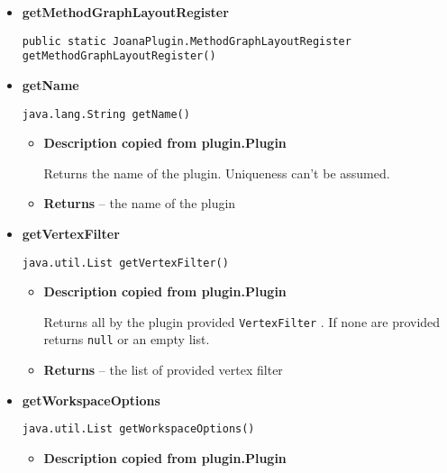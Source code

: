{{{{{{{{{{{{{{{{\begin{itemize}
{\begin{itemize}
{Returns all by the plugin provided \texttt{\small Importer}{\small 
{}}. If none are provided returns \texttt{\small null} or an empty list.
}
\item{{\bf  Returns} -- 
a list of provided importer 
}%
\end{itemize}
}%
\item{ 
{\bf  getMethodGraphLayoutRegister}\\
\begin{lstlisting}[frame=none]
public static JoanaPlugin.MethodGraphLayoutRegister getMethodGraphLayoutRegister()\end{lstlisting} %
}%
\item{ 
{\bf  getName}\\
\begin{lstlisting}[frame=none]
java.lang.String getName()\end{lstlisting} %
\begin{itemize}
\item{
{\bf  Description copied from plugin.Plugin{\small {}} }

Returns the name of the plugin. Uniqueness can't be assumed.
}
\item{{\bf  Returns} -- 
the name of the plugin 
}%
\end{itemize}
}%
\item{ 
{\bf  getVertexFilter}\\
\begin{lstlisting}[frame=none]
java.util.List getVertexFilter()\end{lstlisting} %
\begin{itemize}
\item{
{\bf  Description copied from plugin.Plugin{\small {}} }

Returns all by the plugin provided \texttt{\small VertexFilter}{\small 
{}}. If none are provided returns \texttt{\small null} or an empty list.
}
\item{{\bf  Returns} -- 
the list of provided vertex filter 
}%
\end{itemize}
}%
\item{ 
{\bf  getWorkspaceOptions}\\
\begin{lstlisting}[frame=none]
java.util.List getWorkspaceOptions()\end{lstlisting} %
\begin{itemize}
\item{
{\bf  Description copied from plugin.Plugin{\small {}} }

}
\end{itemize}}
\end{itemize}}}}}}}}}}}}}}}}}
